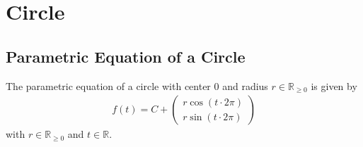 \section{Circle}
\subsection{Parametric Equation of a Circle}
The parametric equation of a circle with center $0$ and radius $r \in \mathbb{R}_{\geq 0}$ is given by
\begin{align*}
f\left(t\right) = C + 
\left(\begin{matrix}
r \cos\left(t\cdot 2\pi\right)\\
r \sin\left(t\cdot 2\pi\right)
\end{matrix}\right)
\end{align*}
with $r \in \mathbb{R}_{\geq 0}$ and $t \in \mathbb{R}$.
